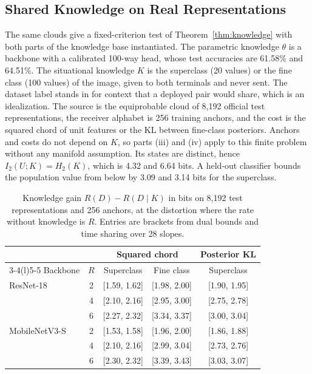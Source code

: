 \documentclass[10pt,journal]{IEEEtran}
\begin{document}
\subsection{Shared Knowledge on Real Representations}
The same clouds give a fixed-criterion test of Theorem~\ref{thm:knowledge} with both parts of the knowledge base instantiated. The parametric knowledge $\theta$ is a backbone with a calibrated 100-way head, whose test accuracies are 61.58\% and 64.51\%. The situational knowledge $K$ is the superclass (20 values) or the fine class (100 values) of the image, given to both terminals and never sent. The dataset label stands in for context that a deployed pair would share, which is an idealization. The source is the equiprobable cloud of 8,192 official test representations, the receiver alphabet is 256 training anchors, and the cost is the squared chord of unit features or the KL between fine-class posteriors. Anchors and costs do not depend on $K$, so parts (iii) and (iv) apply to this finite problem without any manifold assumption. Its states are distinct, hence $I_2(U;K)=H_2(K)$, which is 4.32 and 6.64 bits. A held-out classifier bounds the population value from below by 3.09 and 3.14 bits for the superclass.
\begin{table}[t]
\caption{Knowledge gain $R(D)-R(D\mid K)$ in bits on 8,192 test representations and 256 anchors, at the distortion where the rate without knowledge is $R$. Entries are brackets from dual bounds and time sharing over 28 slopes.}\label{tab:kreal}\centering
\setlength{\tabcolsep}{3pt}
\begin{tabular}{@{}lcccc@{}}\toprule
 & & \multicolumn{2}{c}{Squared chord} & Posterior KL\\\cmidrule(lr){3-4}\cmidrule(l){5-5}
Backbone & $R$ & Superclass & Fine class & Superclass\\\midrule
ResNet-18 & 2 & [1.59, 1.62] & [1.98, 2.00] & [1.90, 1.95]\\
          & 4 & [2.10, 2.16] & [2.95, 3.00] & [2.75, 2.78]\\
          & 6 & [2.27, 2.32] & [3.34, 3.37] & [3.00, 3.04]\\
MobileNetV3-S & 2 & [1.53, 1.58] & [1.96, 2.00] & [1.86, 1.88]\\
              & 4 & [2.10, 2.16] & [2.99, 3.04] & [2.73, 2.76]\\
              & 6 & [2.30, 2.32] & [3.39, 3.43] & [3.03, 3.07]\\\bottomrule
\end{tabular}\end{table}
\end{document}
